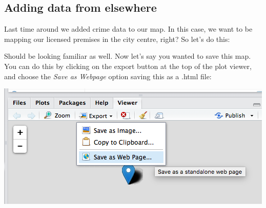 \documentclass[]{book}
\newenvironment{Shaded}{\begin{snugshade}}{\end{snugshade}}
\newcommand{\DataTypeTok}[1]{\textcolor[rgb]{0.13,0.29,0.53}{#1}}
\newcommand{\KeywordTok}[1]{\textcolor[rgb]{0.13,0.29,0.53}{\textbf{#1}}}
\newcommand{\NormalTok}[1]{#1}
\newcommand{\OperatorTok}[1]{\textcolor[rgb]{0.81,0.36,0.00}{\textbf{#1}}}
\newcommand{\StringTok}[1]{\textcolor[rgb]{0.31,0.60,0.02}{#1}}
\begin{document}
\hypertarget{htmlwidget-ece3fdbf4b9801bd3c10}{}

\hypertarget{adding-data-from-elsewhere}{%
\subsection{Adding data from elsewhere}\label{adding-data-from-elsewhere}}

Last time around we added crime data to our map. In this case, we want to be mapping our licensed premises in the city centre, right? So let's do this:

\begin{Shaded}
\end{Shaded}

\hypertarget{htmlwidget-812f0e252e22c7979cc2}{}

Should be looking familiar as well. Now let's say you wanted to save this map. You can do this by clicking on the export button at the top of the plot viewer, and choose the \emph{Save as Webpage} option saving this as a .html file:

\includegraphics{img/save_as_wp.png}
\end{document}
